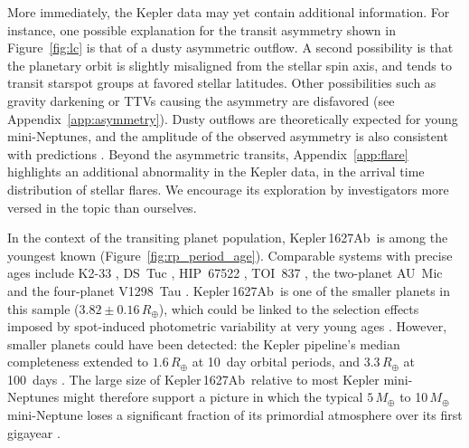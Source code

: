 \documentclass[12pt,modern,twocolumn,tighten]{aastex63}
\newcommand{\pn}{Kepler\,1627Ab} %
\begin{document}
More immediately, the Kepler data may yet contain additional
information.  For instance, one possible explanation for the transit
asymmetry shown in Figure~\ref{fig:lc} is that of a dusty asymmetric
outflow.  A second possibility is that the planetary orbit is slightly
misaligned from the stellar spin axis, and tends to transit starspot
groups at favored stellar latitudes.  Other possibilities such as
gravity darkening or TTVs causing the asymmetry are disfavored (see
Appendix~\ref{app:asymmetry}).  Dusty outflows are theoretically
expected for young mini-Neptunes, and the amplitude of the observed
asymmetry is also consistent with predictions \citep{wang_dai_2019}.
Beyond the asymmetric transits, Appendix~\ref{app:flare} highlights an
additional abnormality in the Kepler data, in the arrival time
distribution of stellar flares.  We encourage its exploration by
investigators more versed in the topic than ourselves.

In the context of the transiting planet population, \pn\ is among the
youngest known (Figure~\ref{fig:rp_period_age}).  Comparable systems
with precise ages include K2-33
\citep{Mann_K2_33b_2016,David_et_al_2017}, DS~Tuc
\citep{benatti_possibly_2019,newton_tess_2019} , HIP~67522
\citep{rizzuto_tess_2020}, TOI~837 \citep{bouma_cluster_2020}, the
two-planet AU~Mic \citep{plavchan_planet_2020,martioli_aumicbc_2021}
and the four-planet V1298~Tau \citep{david_four_2019}.  \pn\ is one of
the smaller planets in this sample ($3.82\pm0.16\,R_\oplus$), which
could be linked to the selection effects imposed by spot-induced
photometric variability at very young ages \citep[{\it
e.g.},][]{zhou_2021_tois}.  However, smaller planets could have been
detected: the Kepler pipeline's median completeness extended to
$1.6\,R_\oplus$ at 10~day orbital periods, and $3.3\,R_\oplus$ at
100~days \citep{2021ascl.soft07027B}.  The large size of \pn\ relative
to most Kepler mini-Neptunes might therefore support a picture
in which the typical $5\,M_\oplus$ to 10$\,M_\oplus$ mini-Neptune
\citep{wu_mass_2019} loses a significant fraction of its primordial
atmosphere over its first gigayear
\citep{Owen_Wu_2013,ginzburg_corepowered_2018}.  

\end{document}

